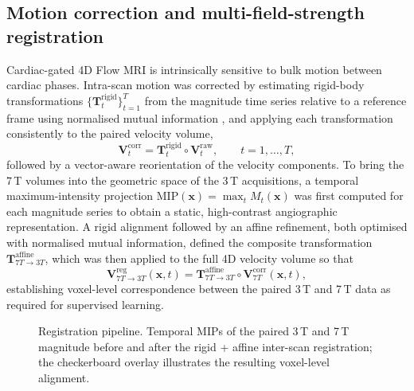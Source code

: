 \subsection*{Motion correction and multi-field-strength registration}

Cardiac-gated 4D Flow MRI is intrinsically sensitive to bulk motion
between cardiac phases. Intra-scan motion was corrected by estimating
rigid-body transformations $\{\mathbf{T}_t^{\text{rigid}}\}_{t=1}^{T}$
from the magnitude time series relative to a reference frame using
normalised mutual information \cite{maes1997}, and applying each
transformation consistently to the paired velocity volume,
\begin{equation}
    \mathbf{V}_t^{\text{corr}}
    = \mathbf{T}_t^{\text{rigid}} \circ \mathbf{V}_t^{\text{raw}},
    \qquad t = 1, \ldots, T,
\end{equation}
followed by a vector-aware reorientation of the velocity components. To
bring the 7\,T volumes into the geometric space of the 3\,T
acquisitions, a temporal maximum-intensity projection
$\mathrm{MIP}(\mathbf{x}) = \max_t M_t(\mathbf{x})$ was first computed
for each magnitude series to obtain a static, high-contrast angiographic
representation. A rigid alignment followed by an affine refinement,
both optimised with normalised mutual information, defined the
composite transformation $\mathbf{T}^{\text{affine}}_{7T \to 3T}$, which
was then applied to the full 4D velocity volume so that
\begin{equation}
    \mathbf{V}_{7T \to 3T}^{\text{reg}}(\mathbf{x}, t)
    = \mathbf{T}^{\text{affine}}_{7T \to 3T} \circ
      \mathbf{V}_{7T}^{\text{corr}}(\mathbf{x}, t),
\end{equation}
establishing voxel-level correspondence between the paired 3\,T and
7\,T data as required for supervised learning.

\begin{figure}[!htbp]
    \centering
    \caption{Registration pipeline. Temporal MIPs of the paired 3\,T and
    7\,T magnitude before and after the rigid + affine inter-scan
    registration; the checkerboard overlay illustrates the resulting
    voxel-level alignment.}
    \label{fig:registration}
\end{figure}

